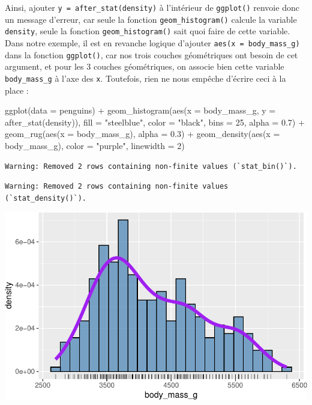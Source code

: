 \documentclass[
  a4paper,
  DIV=11,
  numbers=noendperiod,
  oneside]{scrreprt}
\newenvironment{Shaded}{}{}
\newcommand{\AttributeTok}[1]{\textcolor[rgb]{0.84,0.23,0.29}{#1}}
\newcommand{\DecValTok}[1]{\textcolor[rgb]{0.00,0.36,0.77}{#1}}
\newcommand{\FloatTok}[1]{\textcolor[rgb]{0.00,0.36,0.77}{#1}}
\newcommand{\FunctionTok}[1]{\textcolor[rgb]{0.44,0.26,0.76}{#1}}
\newcommand{\NormalTok}[1]{\textcolor[rgb]{0.14,0.16,0.18}{#1}}
\newcommand{\SpecialCharTok}[1]{\textcolor[rgb]{0.00,0.36,0.77}{#1}}
\newcommand{\StringTok}[1]{\textcolor[rgb]{0.01,0.18,0.38}{#1}}
\begin{document}
Ainsi, ajouter \texttt{y\ =\ after\_stat(density)} à l'intérieur de
\texttt{ggplot()} renvoie donc un message d'erreur, car seule la
fonction \texttt{geom\_histogram()} calcule la variable
\texttt{density}, seule la fonction \texttt{geom\_histogram()} sait quoi
faire de cette variable. Dans notre exemple, il est en revanche logique
d'ajouter \texttt{aes(x\ =\ body\_mass\_g)} dans la fonction
\texttt{ggplot()}, car nos trois couches géométriques ont besoin de cet
argument, et pour les 3 couches géométriques, on associe bien cette
variable \texttt{body\_mass\_g} à l'axe des \texttt{x}. Toutefois, rien
ne nous empêche d'écrire ceci à la place :

\begin{Shaded}
\begin{Highlighting}[]
\FunctionTok{ggplot}\NormalTok{(}\AttributeTok{data =}\NormalTok{ penguins) }\SpecialCharTok{+}
  \FunctionTok{geom\_histogram}\NormalTok{(}\FunctionTok{aes}\NormalTok{(}\AttributeTok{x =}\NormalTok{ body\_mass\_g, }\AttributeTok{y =} \FunctionTok{after\_stat}\NormalTok{(density)),}
                 \AttributeTok{fill =} \StringTok{"steelblue"}\NormalTok{, }\AttributeTok{color =} \StringTok{"black"}\NormalTok{,}
                 \AttributeTok{bins =} \DecValTok{25}\NormalTok{, }\AttributeTok{alpha =} \FloatTok{0.7}\NormalTok{) }\SpecialCharTok{+}
  \FunctionTok{geom\_rug}\NormalTok{(}\FunctionTok{aes}\NormalTok{(}\AttributeTok{x =}\NormalTok{ body\_mass\_g),}
           \AttributeTok{alpha =} \FloatTok{0.3}\NormalTok{) }\SpecialCharTok{+}
  \FunctionTok{geom\_density}\NormalTok{(}\FunctionTok{aes}\NormalTok{(}\AttributeTok{x =}\NormalTok{ body\_mass\_g),}
               \AttributeTok{color =} \StringTok{"purple"}\NormalTok{, }\AttributeTok{linewidth =} \DecValTok{2}\NormalTok{)}
\end{Highlighting}
\end{Shaded}

\begin{verbatim}
Warning: Removed 2 rows containing non-finite values (`stat_bin()`).
\end{verbatim}

\begin{verbatim}
Warning: Removed 2 rows containing non-finite values (`stat_density()`).
\end{verbatim}

\includegraphics{03-visualization_files/figure-pdf/unnamed-chunk-25-1.pdf}
\end{document}
